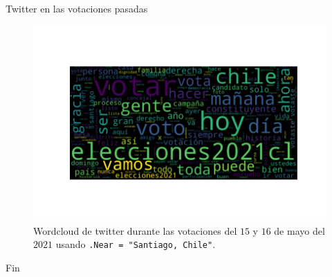 \documentclass{beamer}
\begin{document}
	\begin{frame}{Twitter en las votaciones pasadas}
		\begin{figure}[h]
			\centering
			\includegraphics[scale=.5]{../imgs/wordcloud_chile_votaciones.png}
			\caption{Wordcloud de twitter durante las votaciones del $15$ y $16$ de mayo del $2021$ usando \texttt{.Near = "Santiago, Chile"}.}
		\end{figure}
	\end{frame}

	\begin{frame}{Fin}
		\centering
	\end{frame}

	
	
	
\end{document}
